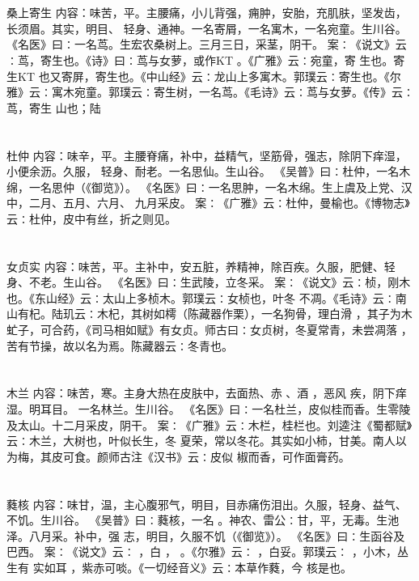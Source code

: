 \documentclass[12pt,UTF8]{ctexbook}
\begin{document}
\chapter{}桑上寄生
内容：味苦，平。主腰痛，小儿背强，痈肿，安胎，充肌肤，坚发齿，长须眉。其实，明目、 
轻身、通神。一名寄屑，一名寓木，一名宛童。生川谷。 
《名医》曰∶一名茑。生宏农桑树上。三月三日，采茎，阴干。 
案∶《说文》云∶茑，寄生也。《诗》曰∶茑与女萝，或作KT 。《广雅》云∶宛童，寄 
生也。寄生KT 也又寄屏，寄生也。《中山经》云∶龙山上多寓木。郭璞云∶寄生也。《尔 
雅》云∶寓木宛童。郭璞云∶寄生树，一名茑。《毛诗》云∶茑与女萝。《传》云∶茑，寄生 
山也；陆 


\chapter{}杜仲
内容：味辛，平。主腰脊痛，补中，益精气，坚筋骨，强志，除阴下痒湿，小便余沥。久服， 
轻身、耐老。一名思仙。生山谷。 
《吴普》曰∶杜仲，一名木绵，一名思仲（《御览》）。 
《名医》曰∶一名思肿，一名木绵。生上虞及上党、汉中，二月、五月、六月、 
九月采皮。 
案∶《广雅》云∶杜仲，曼榆也。《博物志》云∶杜仲，皮中有丝，折之则见。 


\chapter{}女贞实
内容：味苦，平。主补中，安五脏，养精神，除百疾。久服，肥健、轻身、不老。生山谷。 
《名医》曰∶生武陵，立冬采。 
案∶《说文》云∶桢，刚木也。《东山经》云∶太山上多桢木。郭璞云∶女桢也，叶冬 
不凋。《毛诗》云∶南山有杞。陆玑云∶木杞，其树如樗（陈藏器作栗），一名狗骨，理白滑 
，其子为木虻子，可合药，《司马相如赋》有女贞。师古曰∶女贞树，冬夏常青，未尝凋落 
，苦有节操，故以名为焉。陈藏器云∶冬青也。 


\chapter{}木兰
内容：味苦，寒。主身大热在皮肤中，去面热、赤 、酒 ，恶风 疾，阴下痒湿。明耳目。 
一名林兰。生川谷。 
《名医》曰∶一名杜兰，皮似桂而香。生零陵及太山。十二月采皮，阴干。 
案∶《广雅》云∶木栏，桂栏也。刘逵注《蜀都赋》云∶木兰，大树也，叶似长生，冬 
夏荣，常以冬花。其实如小柿，甘美。南人以为梅，其皮可食。颜师古注《汉书》云∶皮似 
椒而香，可作面膏药。 


\chapter{}蕤核
内容：味甘，温，主心腹邪气，明目，目赤痛伤泪出。久服，轻身、益气、不饥。生川谷。 
《吴普》曰∶蕤核，一名 。神农、雷公∶甘，平，无毒。生池泽。八月采。补中，强 
志，明目，久服不饥（《御览》）。 
《名医》曰∶生函谷及巴西。 
案∶《说文》云∶ ，白 ， 。《尔雅》云∶ ，白妥。郭璞云∶ ，小木，丛生有 
实如耳 ，紫赤可啖。《一切经音义》云∶本草作蕤，今 核是也。 
\end{document}
